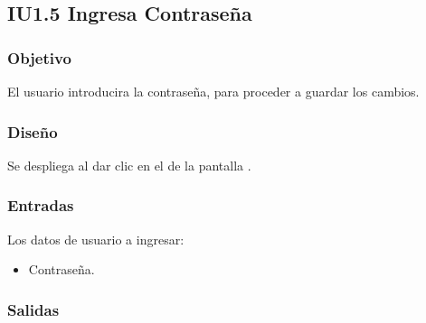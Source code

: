 \newpage
\subsection{IU1.5 Ingresa Contraseña}

\subsubsection{Objetivo}
	El usuario introducira la contraseña, para proceder a guardar los cambios.

\subsubsection{Diseño}
	Se despliega al dar clic en el  de la pantalla .


\subsubsection{Entradas}
Los datos de usuario a ingresar:
\begin{itemize}
	\item Contraseña.
\end{itemize}

\subsubsection{Salidas}
\begin{Citemize}
	\item {}
	\item {}
	\item {}
\end{Citemize}
